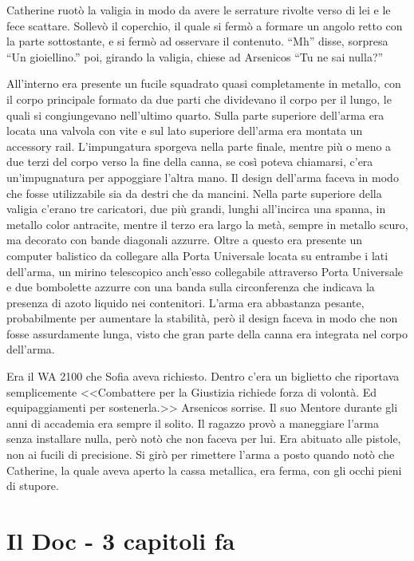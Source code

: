     Catherine ruotò la valigia in modo da avere le serrature rivolte verso di lei e le fece scattare. Sollevò il
    coperchio, il quale si fermò a formare un angolo retto con la parte sottostante, e si fermò ad osservare il
    contenuto. ``Mh'' disse, sorpresa ``Un gioiellino.'' poi, girando la valigia, chiese ad Arsenicos ``Tu ne sai
    nulla?''

    All'interno era presente un fucile squadrato quasi completamente in metallo, con il corpo principale formato da due
    parti che dividevano il corpo per il lungo, le quali si congiungevano nell'ultimo quarto. Sulla parte superiore
    dell'arma era locata una valvola con vite e sul lato superiore dell'arma era montata un accessory rail. L'impungatura
    sporgeva nella parte finale, mentre più o meno a due terzi del corpo verso la fine della canna, se così
    poteva chiamarsi, c'era un'impugnatura per appoggiare l'altra mano. Il design dell'arma faceva in modo che fosse
    utilizzabile sia da destri che da mancini. Nella parte superiore della valigia c'erano tre caricatori, due più
    grandi, lunghi all'incirca una spanna, in metallo color antracite, mentre il terzo era largo la metà, sempre in
    metallo scuro, ma decorato con bande diagonali azzurre. Oltre a questo era presente un computer balistico da
    collegare alla Porta Universale locata su entrambe i lati dell'arma, un mirino telescopico anch'esso collegabile
    attraverso Porta Universale e due bombolette azzurre con una banda sulla circonferenza che indicava la presenza di
    azoto liquido nei contenitori. L'arma era abbastanza pesante, probabilmente per aumentare la stabilità, però il
    design faceva in modo che non fosse assurdamente lunga, visto che gran parte della canna era integrata nel corpo
    dell'arma.

    Era il WA 2100 che Sofia aveva richiesto. Dentro c'era un biglietto che riportava semplicemente <<Combattere per la
    Giustizia richiede forza di volontà. Ed equipaggiamenti per sostenerla.>> Arsenicos sorrise. Il suo Mentore durante
    gli anni di accademia era sempre il solito. Il ragazzo provò a maneggiare l'arma senza installare nulla, però notò
    che non faceva per lui. Era abituato alle pistole, non ai fucili di precisione. Si girò per rimettere l'arma a posto
    quando notò che Catherine, la quale aveva aperto la cassa metallica, era ferma, con gli occhi pieni di stupore.

  \section*{Il Doc - 3 capitoli fa}

